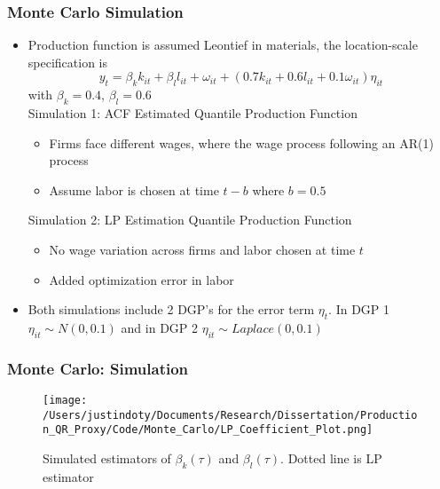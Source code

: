 \documentclass{beamer}
\begin{document}

\begin{frame}
\frametitle{Monte Carlo Simulation}
\begin{itemize}
	\item Production function is assumed Leontief in materials, the location-scale specification is
	\begin{equation}
		y_{t}=\beta_{k}k_{it}+\beta_{l}l_{it}+\omega_{it}+(0.7k_{it}+0.6l_{it}+0.1\omega_{it})\eta_{it}
	\end{equation}
	with $\beta_{k}=0.4$, $\beta_{l}=0.6$\\
	Simulation 1: ACF Estimated Quantile Production Function
	\begin{itemize}
		\item Firms face different wages, where the wage process following an AR(1) process
		\item Assume labor is chosen at time $t-b$ where $b=0.5$
	\end{itemize}
	Simulation 2: LP Estimation Quantile Production Function
	\begin{itemize}
		\item No wage variation across firms and labor chosen at time $t$
		\item Added optimization error in labor
	\end{itemize}
	\item Both simulations include 2 DGP's for the error term $\eta_{t}$. In DGP 1 $\eta_{it} \sim N(0,0.1)$ and in DGP 2 $\eta_{it} \sim \textit{Laplace}(0,0.1)$
\end{itemize}
\end{frame}


\begin{frame}
\frametitle{Monte Carlo: Simulation}
\begin{figure}[H]
\centering
\caption{Simulated estimators of $\beta_{k}(\tau)$ and $\beta_{l}(\tau)$. Dotted line is LP estimator}
\texttt{[image: /Users/justindoty/Documents/Research/Dissertation/Production\_QR\_Proxy/Code/Monte\_Carlo/LP\_Coefficient\_Plot.png]}
\end{figure}
\end{frame}
\end{document}
